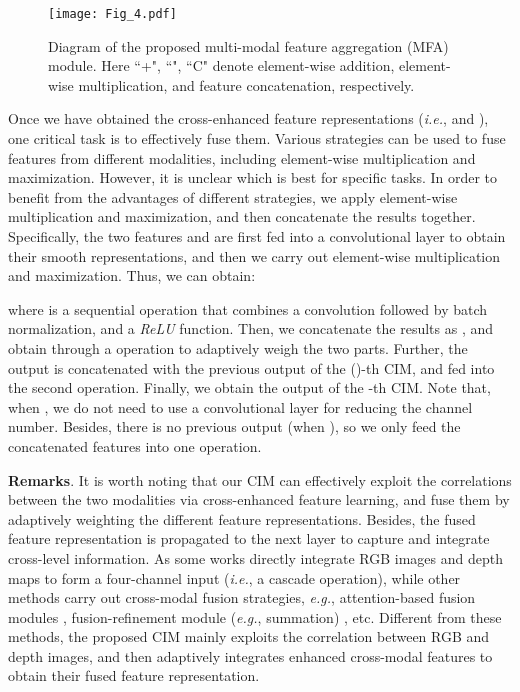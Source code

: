 \documentclass[10pt,twocolumn,letterpaper]{article}
\def\ie{\emph{i.e.}}
\def\eg{\emph{e.g.}}
\begin{document}
\begin{figure}
	\begin{centering}
		\texttt{[image: Fig\_4.pdf]}
		\caption{Diagram of the proposed multi-modal feature aggregation (MFA) module. Here ``+", ``", ``C" denote element-wise addition, element-wise multiplication, and feature concatenation, respectively.}
		\label{fig04}
	\end{centering}
\end{figure}



Once we have obtained the cross-enhanced feature representations (\ie,  and ), one critical task is to effectively fuse them. Various strategies can be used to fuse features from different modalities, including element-wise multiplication and maximization. However, it is unclear which is best for specific tasks. In order to benefit from the advantages of different strategies, we apply element-wise multiplication and maximization, and then concatenate the results together. Specifically, the two features  and  are first fed into a  convolutional layer to obtain their smooth representations, and then we carry out element-wise multiplication and maximization. Thus, we can obtain:

where  is a sequential operation that combines a  convolution followed by
batch normalization, and a \emph{ReLU} function. Then, we concatenate the results as , and obtain  through a  operation to adaptively weigh the two parts. Further, the output  is concatenated with the previous output  of the ()-th CIM, and fed into the second  operation. Finally, we obtain the output  of the -th CIM. Note that, when , we do not need to use a  convolutional layer for reducing the channel number. Besides, there is no previous output  (when ), so we only feed the concatenated features into one  operation.

\textbf{Remarks}. It is worth noting that our CIM can effectively exploit the correlations between the two modalities via cross-enhanced feature learning, and fuse them by adaptively weighting the different feature representations. Besides, the fused feature representation  is propagated to the next layer to capture and integrate cross-level information. As some works \cite{liu2019salient,peng2014rgbd,song2017depth} directly integrate RGB images and depth maps to form a four-channel input (\ie, a cascade operation), while other methods carry out cross-modal fusion strategies, \eg, attention-based fusion modules \cite{chen2019three,chen2018attention}, fusion-refinement module (\eg, summation) \cite{liu2019two}, etc. Different from these methods, the proposed CIM mainly exploits the correlation between RGB and depth images, and then adaptively integrates enhanced cross-modal features to obtain their fused feature representation.
\end{document}

